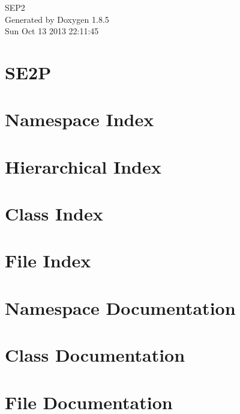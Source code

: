\documentclass[twoside]{book}
\newcommand{\clearemptydoublepage}{%
  \newpage{\pagestyle{empty}\cleardoublepage}%
}
\begin{document}
\hypersetup{pageanchor=false}
\begin{titlepage}
\vspace*{7cm}
\begin{center}%
{\Large S\-E\-P2 }\\
\vspace*{1cm}
{\large Generated by Doxygen 1.8.5}\\
\vspace*{0.5cm}
{\small Sun Oct 13 2013 22:11:45}\\
\end{center}
\end{titlepage}
\clearemptydoublepage
\tableofcontents
\clearemptydoublepage
{}
\hypersetup{pageanchor=true}

\chapter{S\-E2\-P}
\label{md__c_1__users__nata__documents__s_e_p2_sourcetree__r_e_a_d_m_e}
\hypertarget{md__c_1__users__nata__documents__s_e_p2_sourcetree__r_e_a_d_m_e}{}

\chapter{Namespace Index}

\chapter{Hierarchical Index}

\chapter{Class Index}

\chapter{File Index}

\chapter{Namespace Documentation}

\chapter{Class Documentation}




\chapter{File Documentation}

















\newpage
{}
{}
\printindex
\end{document}

